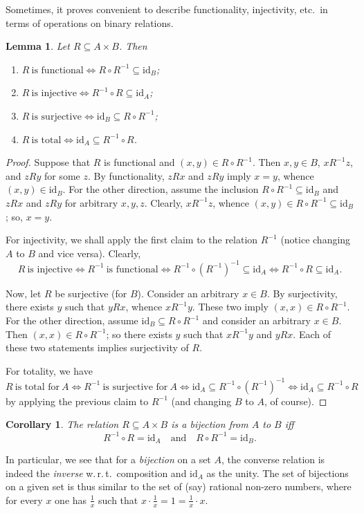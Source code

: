 \documentclass[12pt,notitlepage]{article}
\theoremstyle{plain}
\newtheorem{lemma}[thm]{Lemma}
\newtheorem{corr}[thm]{Corollary}
\theoremstyle{definition}
\theoremstyle{plain}
\newcommand{\sbs}{\subseteq}
\newcommand{\id}{\mathrm{id}}
\newcommand{\1}{\mathbf{1}}
\newcommand{\0}{\mathbf{0}}
\begin{document}
Sometimes, it proves convenient to describe functionality, injectivity, etc.\ in terms of operations on binary relations.
\begin{lemma}\label{rel:fnc_algebra}
Let $R \sbs A \times B$. Then
\begin{enumerate}
\item $R\ \mbox{is functional} \iff R \circ R^{-1} \sbs \id_B$;
\item $R\ \mbox{is injective} \iff R^{-1} \circ R \sbs \id_A$;
\item $R\ \mbox{is surjective} \iff \id_B \sbs R \circ R^{-1}$;
\item $R\ \mbox{is total} \iff \id_A \sbs R^{-1} \circ R$.
\end{enumerate}
\end{lemma}
\begin{proof}
Suppose that $R$ is functional and $(x, y) \in R \circ R^{-1}$. Then $x, y \in B$, $x R^{-1} z$, and $z R y$ for some $z$. By functionality, $z R x$ and $z R y$ imply $x = y$, whence $(x, y) \in \id_B$. For the other direction, assume the inclusion $R \circ R^{-1} \sbs \id_B$ and $z R x$ and $z R y$ for arbitrary $x, y, z$. Clearly, $x R^{-1} z$, whence $(x, y) \in R \circ R^{-1} \sbs \id_B$; so, $x = y$.

For injectivity, we shall apply the first claim to the relation $R^{-1}$ (notice changing $A$ to $B$ and vice versa). Clearly,
$$R\ \mbox{is injective} \iff R^{-1}\ \mbox{is functional} \iff R^{-1} \circ (R^{-1})^{-1} \sbs \id_A \iff R^{-1} \circ R \sbs \id_A.$$

Now, let $R$ be surjective (for $B$). Consider an arbitrary $x \in B$. By surjectivity, there exists $y$ such that $y R x$, whence $x R^{-1} y$. These two imply $(x, x) \in R  \circ R^{-1}$. For the other direction, assume $\id_B \sbs R \circ R^{-1}$ and consider an arbitrary $x \in B$. Then $(x, x) \in R \circ R^{-1}$; so there exists $y$ such that $x R^{-1} y$ and $y R x$. Each of these two statements implies surjectivity of $R$.

For totality, we have
$$R\ \mbox{is total for}\ A \iff R^{-1}\ \mbox{is surjective for}\ A \iff \id_A \sbs R^{-1} \circ (R^{-1})^{-1} \iff \id_A \sbs R^{-1} \circ R$$
by applying the previous claim to $R^{-1}$ (and changing $B$ to $A$, of course).
\end{proof}

\begin{corr}\label{ch0:bi_cmp}
The relation $R \sbs A \times B$ is a bijection from $A$ to $B$ iff
$$R^{-1}\circ R = \id_A\quad \mbox{and}\quad R \circ R^{-1} = \id_B.$$
\end{corr}
In particular, we see that for a \emph{bijection} on a set $A$, the converse relation is indeed the \emph{inverse} w.\,r.\,t.\ composition and $\id_A$ as the unity. The set of bijections on a given set is thus similar to the set of (say) rational non-zero numbers, where for every $x$ one has $\frac{1}{x}$ such that $x \cdot \frac{1}{x} = 1 = \frac{1}{x} \cdot x$.
\end{document}
